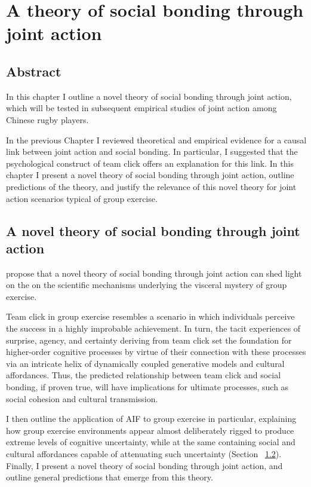 \chapter{A theory of social bonding through joint action
\label{chap:theoryGE}}

\minitoc


  \begin{CJK}{UTF8}{gbsn}

\section{Abstract}
  In this chapter I outline a novel theory of social bonding through joint action, which will be tested in subsequent empirical studies of joint action among Chinese rugby players.

  In the previous Chapter I reviewed theoretical and empirical evidence for a causal link between joint action and social bonding.  In particular, I suggested that the psychological construct of team click offers an explanation for this link. In this chapter I present a novel theory of social bonding through joint action, outline predictions of the theory, and justify the relevance of this novel theory for joint action scenarios typical of group exercise.




\section{A novel theory of social bonding through joint action\label{sect:novelTheory}}

propose that a novel theory of social bonding through joint action can shed light on the on the scientific mechanisms underlying the visceral mystery of group exercise.

Team click in group exercise resembles a scenario in which individuals perceive the success in a highly improbable achievement.  In turn, the tacit experiences of surprise, agency, and certainty deriving from team click set the foundation for higher-order cognitive processes by virtue of their connection with these processes via an intricate  helix of dynamically coupled generative models and cultural affordances.  Thus, the predicted relationship between team click and social bonding, if proven true, will have implications for ultimate processes, such as social cohesion and cultural transmission.

I then outline the application of AIF to group exercise in particular, explaining how group exercise environments appear almost deliberately rigged to produce extreme levels of cognitive uncertainty, while at the same containing social and cultural affordances capable of attenuating such uncertainty (Section ~\ref{}).  Finally, I present a novel theory of social bonding through joint action, and outline general predictions that emerge from this theory.






\end{CJK}
